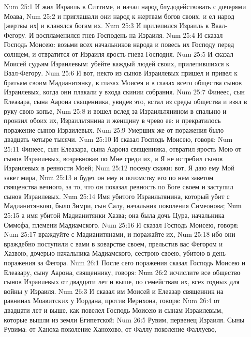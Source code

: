 \vs Num 25:1 И жил Израиль в Ситтиме, и начал народ блудодействовать с дочерями Моава,
\vs Num 25:2 и приглашали они народ к жертвам богов своих, и ел народ [жертвы их] и кланялся богам их.
\vs Num 25:3 И прилепился Израиль к Ваал-Фегору. И воспламенился гнев Господень на Израиля.
\vs Num 25:4 И сказал Господь Моисею: возьми всех начальников народа и повесь их Господу перед солнцем, и отвратится от Израиля ярость гнева Господня.
\vs Num 25:5 И сказал Моисей судьям Израилевым: убейте каждый людей своих, прилепившихся к Ваал-Фегору.
\rsbpar\vs Num 25:6 И вот, некто из сынов Израилевых пришел и привел к братьям своим Мадианитянку, в глазах Моисея и в глазах всего общества сынов Израилевых, когда они плакали у входа скинии собрания.
\vs Num 25:7 Финеес, сын Елеазара, сына Аарона священника, увидев это, встал из среды общества и взял в руку свою копье,
\vs Num 25:8 и вошел вслед за Израильтянином в спальню и пронзил обоих их, Израильтянина и женщину в чрево ее: и прекратилось поражение сынов Израилевых.
\vs Num 25:9 Умерших же от поражения было двадцать четыре тысячи.
\rsbpar\vs Num 25:10 И сказал Господь Моисею, говоря:
\vs Num 25:11 Финеес, сын Елеазара, сына Аарона священника, отвратил ярость Мою от сынов Израилевых, возревновав по Мне среди их, и Я не истребил сынов Израилевых в ревности Моей;
\vs Num 25:12 посему скажи: вот, Я даю ему Мой завет мира,
\vs Num 25:13 и будет он ему и потомству его по нем заветом священства вечного, за то, что он показал ревность по Боге своем и заступил сынов Израилевых.
\vs Num 25:14 Имя убитого Израильтянина, который убит с Мадианитянкою, было Зимри, сын Салу, начальник поколения Симеонова;
\vs Num 25:15 а имя убитой Мадианитянки Хазва; она была дочь Цура, начальника Оммофа, племени Мадиамского.
\rsbpar\vs Num 25:16 И сказал Господь Моисею, говоря:
\vs Num 25:17 враждуйте с Мадианитянами, и поражайте их,
\vs Num 25:18 ибо они враждебно поступили с вами в коварстве своем, прельстив вас Фегором и Хазвою, дочерью начальника Мадиамского, сестрою своею, убитою в день поражения за Фегора.
\vs Num 26:1 После сего поражения сказал Господь Моисею и Елеазару, сыну Аарона, священнику, говоря:
\vs Num 26:2 исчислите все общество сынов Израилевых от двадцати лет и выше, по семействам их, всех годных для войны у Израиля.
\vs Num 26:3 И сказал им Моисей и Елеазар священник на равнинах Моавитских у Иордана, против Иерихона, говоря:
\vs Num 26:4  от двадцати лет и выше, как повелел Господь Моисею и сынам Израилевым, которые вышли из земли Египетской:
\vs Num 26:5 Рувим, первенец Израиля. Сыны Рувима: от Ханоха поколение Ханохово, от Фаллу поколение Фаллуево,
